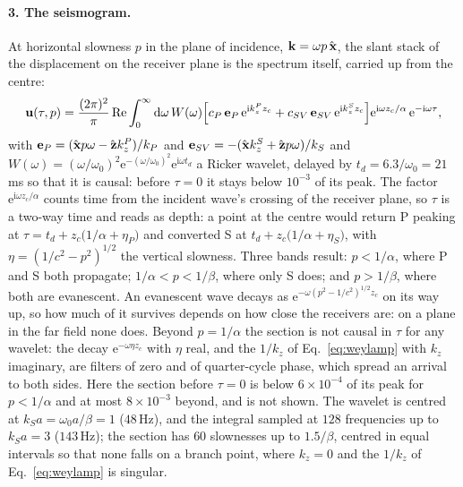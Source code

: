 \documentclass[11pt,a4paper]{article}
\newcommand{\bu}{\mathbf{u}}
\newcommand{\dd}{\mathrm{d}}
\newcommand{\uvec}[1]{{\hat{\mathbf{#1}\mkern-3mu}\mkern3mu}}
\begin{document}
\paragraph{3. The seismogram.} At horizontal slowness $p$ in the plane of incidence, $\mathbf k=\omega p\,\uvec{x}$,
the slant stack of the displacement on the receiver plane is the spectrum itself, carried up from the centre:
\begin{equation}\label{eq:taup}
  \bu(\tau,p)=\frac{(2\pi)^2}{\pi}\operatorname{Re}\int_0^\infty\dd\omega\,W(\omega)
  \Bigl[c_P\,\mathbf e_P\,\mathrm e^{\mathrm ik_z^Pz_c}+c_{SV}\,\mathbf e_{SV}\,\mathrm e^{\mathrm ik_z^Sz_c}\Bigr]
  \mathrm e^{\mathrm i\omega z_c/\alpha}\,\mathrm e^{-\mathrm i\omega\tau},
\end{equation}
with $\mathbf e_P=(\uvec{x}p\omega-\uvec{z}k_z^P)/k_P$ and $\mathbf e_{SV}=-(\uvec{x}k_z^S+\uvec{z}p\omega)/k_S$
and $W(\omega)=(\omega/\omega_0)^2\mathrm e^{-(\omega/\omega_0)^2}\mathrm e^{\mathrm i\omega t_d}$ a Ricker wavelet,
delayed by $t_d=6.3/\omega_0=21$\,ms so that it is causal: before $\tau=0$ it stays below $10^{-3}$ of its peak. The factor
$\mathrm e^{\mathrm i\omega z_c/\alpha}$ counts time from the incident wave's crossing of the receiver plane, so
$\tau$ is a two-way time and reads as depth: a point at the centre would return P peaking at
$\tau=t_d+z_c\bigl(1/\alpha+\eta_P\bigr)$ and converted S at $t_d+z_c\bigl(1/\alpha+\eta_S\bigr)$, with
$\eta=(1/c^2-p^2)^{1/2}$ the vertical slowness. Three bands result: $p<1/\alpha$, where P and S both
propagate; $1/\alpha<p<1/\beta$, where only S does; and $p>1/\beta$, where both are evanescent. An evanescent
wave decays as $\mathrm e^{-\omega(p^2-1/c^2)^{1/2}z_c}$ on its way up, so how much of it survives depends on
how close the receivers are: on a plane in the far field none does. Beyond $p=1/\alpha$ the section is not
causal in $\tau$ for any wavelet: the decay $\mathrm e^{-\omega\eta z_c}$ with $\eta$ real, and the $1/k_z$ of
Eq.~\eqref{eq:weylamp} with $k_z$ imaginary, are filters of zero and of quarter-cycle phase, which spread an
arrival to both sides. Here the section before $\tau=0$ is below $6\times10^{-4}$ of its peak for $p<1/\alpha$ and
at most $8\times10^{-3}$ beyond, and is not shown. The wavelet is centred at
$k_Sa=\omega_0a/\beta=1$ ($48$\,Hz), and the integral sampled at $128$ frequencies up to $k_Sa=3$ ($143$\,Hz);
the section has $60$ slownesses up to $1.5/\beta$, centred in equal intervals so that none falls on a branch
point, where $k_z=0$ and the $1/k_z$ of Eq.~\eqref{eq:weylamp} is singular.
\end{document}
